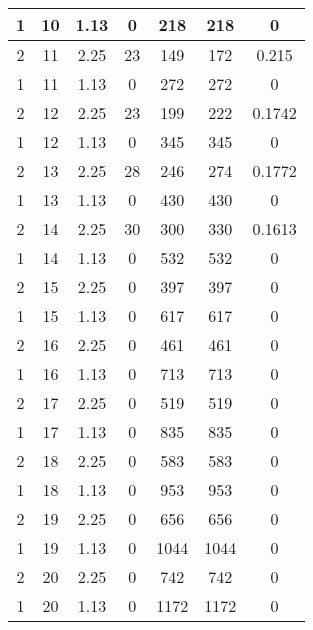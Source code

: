 \documentclass[letterpaper, 12pt]{article}
\begin{document}
\begin{longtable}{|c|c|c|c|c|c|c|}
\hline
1 & 10 & 1.13 & 0 & 218 & 218 & 0 \\
\hline
2 & 11 & 2.25 & 23 & 149 & 172 & 0.215 \\
\hline
1 & 11 & 1.13 & 0 & 272 & 272 & 0 \\
\hline
2 & 12 & 2.25 & 23 & 199 & 222 & 0.1742 \\
\hline
1 & 12 & 1.13 & 0 & 345 & 345 & 0 \\
\hline
2 & 13 & 2.25 & 28 & 246 & 274 & 0.1772 \\
\hline
1 & 13 & 1.13 & 0 & 430 & 430 & 0 \\
\hline
2 & 14 & 2.25 & 30 & 300 & 330 & 0.1613 \\
\hline
1 & 14 & 1.13 & 0 & 532 & 532 & 0 \\
\hline
2 & 15 & 2.25 & 0 & 397 & 397 & 0 \\
\hline
1 & 15 & 1.13 & 0 & 617 & 617 & 0 \\
\hline
2 & 16 & 2.25 & 0 & 461 & 461 & 0 \\
\hline
1 & 16 & 1.13 & 0 & 713 & 713 & 0 \\
\hline
2 & 17 & 2.25 & 0 & 519 & 519 & 0 \\
\hline
1 & 17 & 1.13 & 0 & 835 & 835 & 0 \\
\hline
2 & 18 & 2.25 & 0 & 583 & 583 & 0 \\
\hline
1 & 18 & 1.13 & 0 & 953 & 953 & 0 \\
\hline
2 & 19 & 2.25 & 0 & 656 & 656 & 0 \\
\hline
1 & 19 & 1.13 & 0 & 1044 & 1044 & 0 \\
\hline
2 & 20 & 2.25 & 0 & 742 & 742 & 0 \\
\hline
1 & 20 & 1.13 & 0 & 1172 & 1172 & 0 \\
\hline
\end{longtable}
\end{document}
